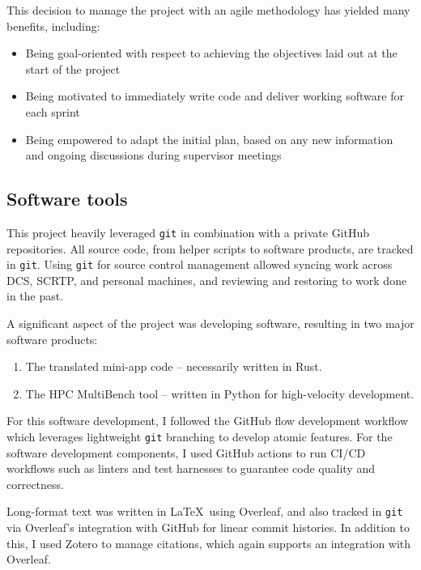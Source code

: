 This decision to manage the project with an agile methodology has yielded many benefits, including:

\begin{itemize}
    \item Being goal-oriented with respect to achieving the objectives laid out at the start of the project
    \item Being motivated to immediately write code and deliver working software for each sprint
    \item Being empowered to adapt the initial plan, based on any new information and ongoing discussions during supervisor meetings
\end{itemize}

\subsection{Software tools}
\label{ssec:software-tools}

This project heavily leveraged \texttt{git} in combination with a private GitHub repositories. All source code, from helper scripts to software products, are tracked in \texttt{git}. Using \texttt{git} for source control management allowed syncing work across DCS, SCRTP, and personal machines, and reviewing and restoring to work done in the past.

A significant aspect of the project was developing software, resulting in two major software products:

\begin{enumerate}
    \item The translated \acrshort{mini-app} code -- necessarily written in Rust.
    \item The HPC MultiBench tool -- written in Python for high-velocity development.
\end{enumerate}

For this software development, I followed the GitHub flow development workflow \cite{GitHubFlow} which leverages lightweight \texttt{git} branching to develop atomic features. For the software development components, I used GitHub actions to run CI/CD workflows \cite{WhatCICD} such as linters and test harnesses to guarantee code quality and correctness.

Long-format text was written in \LaTeX\ using Overleaf\cite{OverleafOnlineLaTeX}, and also tracked in \texttt{git} via Overleaf's integration with GitHub for linear commit histories. In addition to this, I used Zotero \cite{ZoteroYourPersonal} to manage citations, which again supports an integration with Overleaf.

